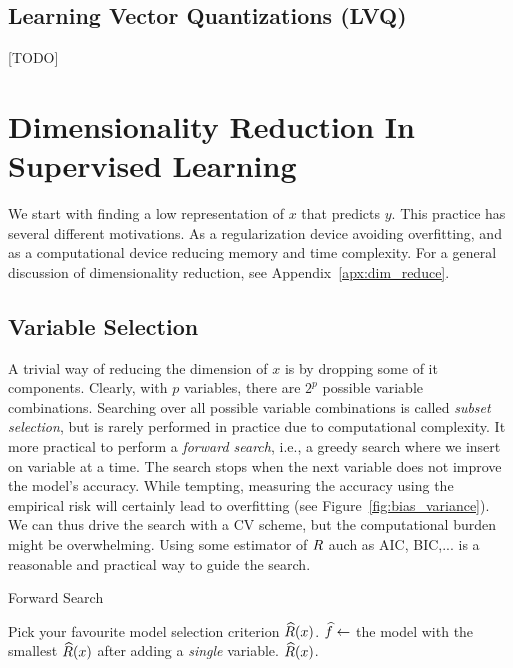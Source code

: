 \subsection{Learning Vector Quantizations (LVQ)}
[TODO]






\section{Dimensionality Reduction In Supervised Learning}
\label{sec:dim_reduce_supervised}
We start with finding a low representation of $x$ that predicts $y$.
This practice has several different motivations. As a regularization device avoiding overfitting, and  as a computational device reducing memory and time complexity. 
For a general discussion of dimensionality reduction, see Appendix~\ref{apx:dim_reduce}.



\subsection{Variable Selection}
A trivial way of reducing the dimension of $x$ is by dropping some of it components. 
Clearly, with $p$ variables, there are $2^p$ possible variable combinations. Searching over all possible variable combinations is called \emph{subset selection}, but is rarely performed in practice due to computational complexity. It more practical to perform a \emph{forward search}, i.e., a greedy search where we insert on variable at a time.
The search stops when the next variable does not improve the model's accuracy. 
While tempting, measuring the accuracy using the empirical risk will certainly lead to overfitting (see Figure~\ref{fig:bias_variance}).
We can thus drive the search with a CV scheme, but the computational burden might be overwhelming. Using some estimator of $R$ auch as AIC, BIC,... is a reasonable and practical way to guide the search.


\begin{algorithm}[H]
\caption{Forward Search}
\begin{algorithmic}
\State Pick your favourite model selection criterion $\widehat{R}(x)$.
    \State $\widehat{f} \gets$ the model with the smallest $\widehat{R}(x)$ after adding a \emph{single} variable.
\EndWhile
\State \Return $\widehat{R}(x)$.
\end{algorithmic}
\end{algorithm}



